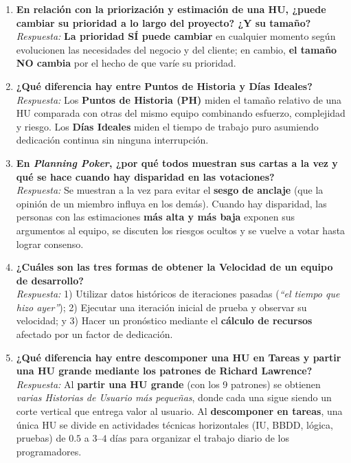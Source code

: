 \begin{enumerate}[label=\textbf{P\arabic*.}, itemsep=6pt]
    \item \textbf{En relación con la priorización y estimación de una HU, ¿puede cambiar su prioridad a lo largo del proyecto? ¿Y su tamaño?}\\
    \textit{Respuesta:} \textbf{La prioridad SÍ puede cambiar} en cualquier momento según evolucionen las necesidades del negocio y del cliente; en cambio, \textbf{el tamaño NO cambia} por el hecho de que varíe su prioridad.

    \item \textbf{¿Qué diferencia hay entre Puntos de Historia y Días Ideales?}\\
    \textit{Respuesta:} Los \textbf{Puntos de Historia (PH)} miden el tamaño relativo de una HU comparada con otras del mismo equipo combinando esfuerzo, complejidad y riesgo. Los \textbf{Días Ideales} miden el tiempo de trabajo puro asumiendo dedicación continua sin ninguna interrupción.

    \item \textbf{En \textit{Planning Poker}, ¿por qué todos muestran sus cartas a la vez y qué se hace cuando hay disparidad en las votaciones?}\\
    \textit{Respuesta:} Se muestran a la vez para evitar el \textbf{sesgo de anclaje} (que la opinión de un miembro influya en los demás). Cuando hay disparidad, las personas con las estimaciones \textbf{más alta y más baja} exponen sus argumentos al equipo, se discuten los riesgos ocultos y se vuelve a votar hasta lograr consenso.

    \item \textbf{¿Cuáles son las tres formas de obtener la Velocidad de un equipo de desarrollo?}\\
    \textit{Respuesta:} 1) Utilizar datos históricos de iteraciones pasadas (\textit{``el tiempo que hizo ayer''}); 2) Ejecutar una iteración inicial de prueba y observar su velocidad; y 3) Hacer un pronóstico mediante el \textbf{cálculo de recursos} afectado por un factor de dedicación.

    \item \textbf{¿Qué diferencia hay entre descomponer una HU en Tareas y partir una HU grande mediante los patrones de Richard Lawrence?}\\
    \textit{Respuesta:} Al \textbf{partir una HU grande} (con los 9 patrones) se obtienen \textit{varias Historias de Usuario más pequeñas}, donde cada una sigue siendo un corte vertical que entrega valor al usuario. Al \textbf{descomponer en tareas}, una única HU se divide en actividades técnicas horizontales (IU, BBDD, lógica, pruebas) de $0.5$ a $3$--$4$ días para organizar el trabajo diario de los programadores.


\end{enumerate}
